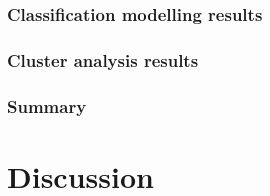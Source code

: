 \documentclass[10pt]{article}\usepackage[]{graphicx}\usepackage[]{color}
\begin{document}
\clearpage
\section{Classification modelling results}

\clearpage
\section{Cluster analysis results}


\clearpage
\section{Summary}



\clearpage
\part{Discussion}
\end{document}
